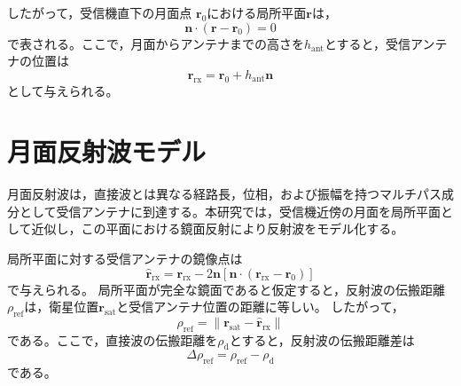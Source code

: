 \documentclass[11pt]{jarticle}
\begin{document}
したがって，受信機直下の月面点 $\mathbf{r}_0$における局所平面$\mathbf{r}$は，
\begin{equation}
    \mathbf{n}\cdot (\mathbf{r}-\mathbf{r}_0)=0
    \label{eq:local_plane}
\end{equation}
で表される。ここで，月面からアンテナまでの高さを$h_\mathrm{ant}$とすると，受信アンテナの位置は
\begin{equation}
    \mathbf{r}_{\mathrm{rx}}
    =
    \mathbf{r}_0
    +
    h_{\mathrm{ant}}\mathbf{n}
    \label{eq:receiver_antenna_position}
\end{equation}
として与えられる。

\section{月面反射波モデル}

月面反射波は，直接波とは異なる経路長，位相，および振幅を持つマルチパス成分として受信アンテナに到達する。本研究では，受信機近傍の月面を局所平面として近似し，この平面における鏡面反射により反射波をモデル化する。

局所平面に対する受信アンテナの鏡像点は
\begin{equation}
    \hat{\mathbf{r}}_{\mathrm{rx}}
    =
    \mathbf{r}_{\mathrm{rx}}
    -
    2\mathbf{n}
    \left[
    \mathbf{n}\cdot
    \left(
    \mathbf{r}_{\mathrm{rx}}
    -
    \mathbf{r}_0
    \right)
    \right]
    \label{eq:image_receiver}
\end{equation}
で与えられる。
局所平面が完全な鏡面であると仮定すると，反射波の伝搬距離$\rho_{\mathrm{ref}}$は，衛星位置$\mathbf{r}_{\mathrm{sat}}$と受信アンテナ位置の距離に等しい。
したがって，
\begin{equation}
    \rho_{\mathrm{ref}}
    =
    \left\|
    \mathbf{r}_{\mathrm{sat}}
    -
    \hat{\mathbf{r}}_{\mathrm{rx}}
    \right\|
    \label{eq:reflected_range_image}
\end{equation}
である。ここで，直接波の伝搬距離を$\rho_{\mathrm{d}}$とすると，反射波の伝搬距離差は
\begin{equation}
    \Delta \rho_{\mathrm{ref}}
    =
    \rho_{\mathrm{ref}}
    -
    \rho_{\mathrm{d}}
    \label{eq:reflected_excess_path}
\end{equation}
である。
\end{document}
